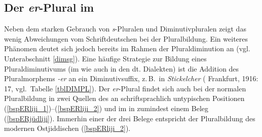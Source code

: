 

\subsection{Der \textit{er}-Plural im \hai{{\LiJi}}}\label{erPLURAL}
Neben dem starken Gebrauch von \textit{s}-Pluralen und Diminutivpluralen zeigt das \hai{{\LiJi}} wenig Abweichungen vom Schriftdeutschen bei der Pluralbildung. Ein weiteres Phänomen deutet sich jedoch bereits im Rahmen der Pluraldiminution an (vgl.\, Unterabschnitt \ref{dimsg}). Eine häufige Strategie zur Bildung eines Pluraldiminutivums (im \hai{{\LiJi}} wie auch in den dt. Dialekten) ist die Addition des Pluralmorphems \textit{-er} an ein Diminutivsuffix, z.\,B.\, in \textit{Stickelcher}  ( Frankfurt, 1916:\,17, vgl.\, Tabelle \ref{tblDIMPL}). Der \textit{er}-Plural findet sich auch bei der normalen Pluralbildung in zwei Quellen des  an schriftsprachlich untypischen Positionen (\ref{bspERliji_1})--(\ref{bspERliji_2}) und im  in zumindest einem Beleg (\ref{bspERjüdliji}). Immerhin einer der drei Belege entspricht der Pluralbildung des modernen Ostjiddischen (\ref{bspERliji_2}). 

